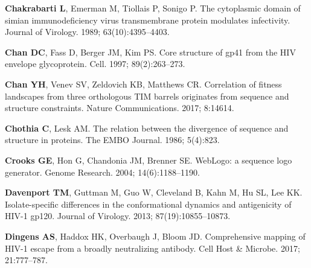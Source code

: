 \documentclass[9pt]{elife}
\begin{document}
\begin{thebibliography}{114}
\textbf{\color{eLifeMediumGrey} Chakrabarti L}, Emerman M, Tiollais P, Sonigo
  P.
\newblock The cytoplasmic domain of simian immunodeficiency virus transmembrane
  protein modulates infectivity.
\newblock Journal of Virology.  1989; 63(10):4395--4403.

\textbf{\color{eLifeMediumGrey} Chan DC}, Fass D, Berger JM, Kim PS.
\newblock Core structure of gp41 from the HIV envelope glycoprotein.
\newblock Cell.  1997; 89(2):263--273.

\textbf{\color{eLifeMediumGrey} Chan YH}, Venev SV, Zeldovich KB, Matthews CR.
\newblock Correlation of fitness landscapes from three orthologous TIM barrels
  originates from sequence and structure constraints.
\newblock Nature Communications.  2017; 8:14614.

\textbf{\color{eLifeMediumGrey} Chothia C}, Lesk AM.
\newblock The relation between the divergence of sequence and structure in
  proteins.
\newblock The EMBO Journal.  1986; 5(4):823.

\textbf{\color{eLifeMediumGrey} Crooks GE}, Hon G, Chandonia JM, Brenner SE.
\newblock WebLogo: a sequence logo generator.
\newblock Genome Research.  2004; 14(6):1188--1190.

\textbf{\color{eLifeMediumGrey} Davenport TM}, Guttman M, Guo W, Cleveland B,
  Kahn M, Hu SL, Lee KK.
\newblock Isolate-specific differences in the conformational dynamics and
  antigenicity of HIV-1 gp120.
\newblock Journal of Virology.  2013; 87(19):10855--10873.

\textbf{\color{eLifeMediumGrey} Dingens AS}, Haddox HK, Overbaugh J, Bloom JD.
\newblock Comprehensive mapping of HIV-1 escape from a broadly neutralizing
  antibody.
\newblock Cell Host \& Microbe.  2017; 21:777--787.


\end{thebibliography}
\end{document}
